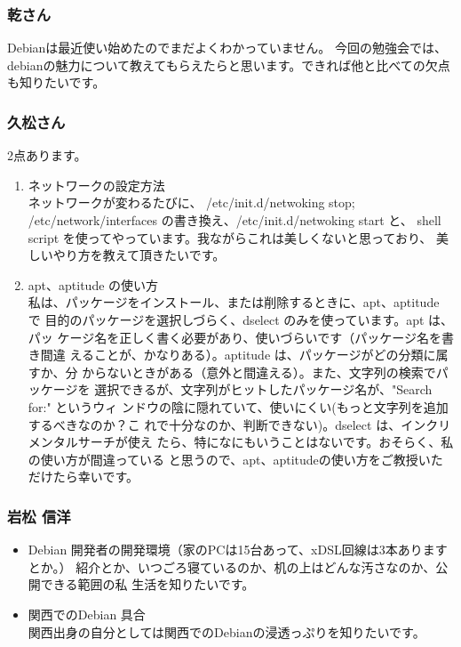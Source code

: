 \documentclass[mingoth,a4paper]{jsarticle}
\begin{document}
\subsubsection{乾さん}

Debianは最近使い始めたのでまだよくわかっていません。
今回の勉強会では、debianの魅力について教えてもらえたらと思います。できれば他と比べての欠点も知りたいです。

\subsubsection{久松さん}

2点あります。
\begin{enumerate}
 \item  ネットワークの設定方法\\
 ネットワークが変わるたびに、 /etc/init.d/netwoking stop;
 /etc/network/interfaces の書き換え、/etc/init.d/netwoking start と、
 shell script を使ってやっています。我ながらこれは美しくないと思っており、
 美しいやり方を教えて頂きたいです。
 \item  apt、aptitude の使い方\\
 私は、パッケージをインストール、または削除するときに、apt、aptitude で
 目的のパッケージを選択しづらく、dselect のみを使っています。apt は、パッ
 ケージ名を正しく書く必要があり、使いづらいです（パッケージ名を書き間違
 えることが、かなりある）。aptitude は、パッケージがどの分類に属すか、分
 からないときがある（意外と間違える）。また、文字列の検索でパッケージを
 選択できるが、文字列がヒットしたパッケージ名が、"Search for:" というウィ
 ンドウの陰に隠れていて、使いにくい(もっと文字列を追加するべきなのか？こ
 れで十分なのか、判断できない)。dselect は、インクリメンタルサーチが使え
 たら、特になにもいうことはないです。おそらく、私の使い方が間違っている
 と思うので、apt、aptitudeの使い方をご教授いただけたら幸いです。
\end{enumerate}

\subsubsection{岩松 信洋}

\begin{itemize}
 \item  Debian 開発者の開発環境（家のPCは15台あって、xDSL回線は3本ありますとか。）
	紹介とか、いつごろ寝ているのか、机の上はどんな汚さなのか、公開できる範囲の私
	生活を知りたいです。
	
 \item 関西でのDebian 具合\\
	関西出身の自分としては関西でのDebianの浸透っぷりを知りたいです。
\end{itemize}
\end{document}
